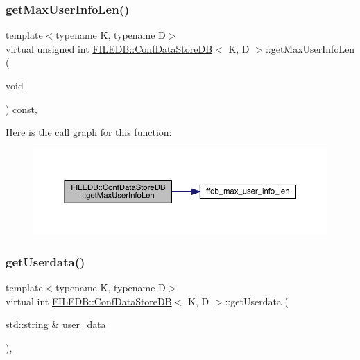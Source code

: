 \subsubsection{\texorpdfstring{getMaxUserInfoLen()}{getMaxUserInfoLen()}\hspace{0.1cm}{\footnotesize\ttfamily [3/3]}}
{\footnotesize\ttfamily template$<$typename K, typename D$>$ \\
virtual unsigned int \mbox{\hyperlink{classFILEDB_1_1ConfDataStoreDB}{F\+I\+L\+E\+D\+B\+::\+Conf\+Data\+Store\+DB}}$<$ K, D $>$\+::get\+Max\+User\+Info\+Len (\begin{DoxyParamCaption}\item[{void}]{ }\end{DoxyParamCaption}) const\hspace{0.3cm}{\ttfamily [inline]}, {\ttfamily [virtual]}}

Here is the call graph for this function\+:
\nopagebreak
\begin{figure}[H]
\begin{center}
\leavevmode
\includegraphics[width=350pt]{d8/d19/classFILEDB_1_1ConfDataStoreDB_a0fc37111156b6c7080ff6a6831c847fc_cgraph}
\end{center}
\end{figure}
\mbox{\label{classFILEDB_1_1ConfDataStoreDB_abf7ce0847e1d68f960836826d68c0079}} 
\subsubsection{\texorpdfstring{getUserdata()}{getUserdata()}\hspace{0.1cm}{\footnotesize\ttfamily [1/3]}}
{\footnotesize\ttfamily template$<$typename K, typename D$>$ \\
virtual int \mbox{\hyperlink{classFILEDB_1_1ConfDataStoreDB}{F\+I\+L\+E\+D\+B\+::\+Conf\+Data\+Store\+DB}}$<$ K, D $>$\+::get\+Userdata (\begin{DoxyParamCaption}\item[{std\+::string \&}]{user\+\_\+data }\end{DoxyParamCaption})\hspace{0.3cm}{\ttfamily [inline]}, {\ttfamily [virtual]}}

